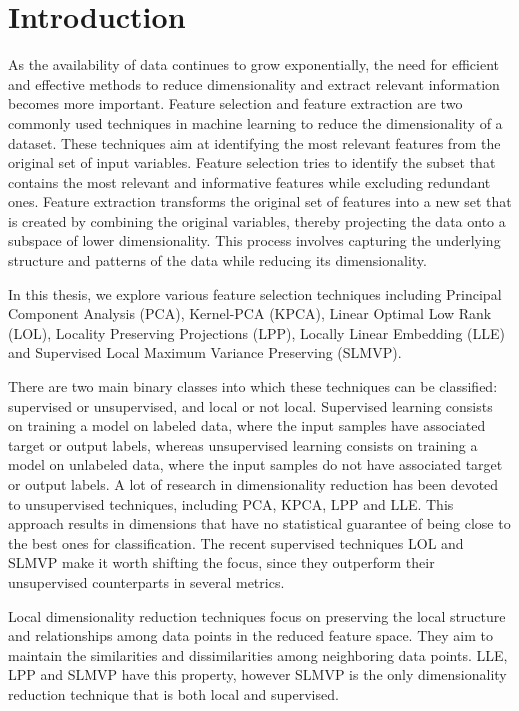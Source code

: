 \chapter{Introduction}

As the availability of data continues to grow exponentially, the need for efficient and effective methods to reduce dimensionality and extract relevant information becomes more important.
Feature selection and feature extraction are two commonly used techniques in machine learning to reduce the dimensionality of a dataset. These techniques aim at identifying the most relevant features from the original set of input variables.
Feature selection tries to identify the subset that contains the most relevant and informative features while excluding redundant ones.
Feature extraction transforms the original set of features into a new set that is created by combining the original variables, thereby projecting the data onto a subspace of lower dimensionality. This process involves capturing the underlying structure and patterns of the data while reducing its dimensionality.

In this thesis, we explore various feature selection techniques including Principal Component Analysis (PCA), Kernel-PCA (KPCA), Linear Optimal Low Rank (LOL), Locality Preserving Projections (LPP), Locally Linear Embedding (LLE) and Supervised Local Maximum Variance Preserving (SLMVP).

There are two main binary classes into which these techniques can be classified: supervised or unsupervised, and local or not local.
Supervised learning consists on training a model on labeled data, where the input samples have associated target or output labels, whereas unsupervised learning consists on training a model on unlabeled data, where the input samples do not have associated target or output labels. A lot of research in dimensionality reduction has been devoted to unsupervised techniques, including PCA, KPCA, LPP and LLE. This approach results in dimensions that have no statistical guarantee of being close to the best ones for classification. The recent supervised techniques LOL and SLMVP make it worth shifting the focus, since they outperform their unsupervised counterparts in several metrics.

Local dimensionality reduction techniques focus on preserving the local structure and relationships among data points in the reduced feature space. They aim to maintain the similarities and dissimilarities among neighboring data points. LLE, LPP and SLMVP have this property, however SLMVP is the only dimensionality reduction technique that is both local and supervised.

